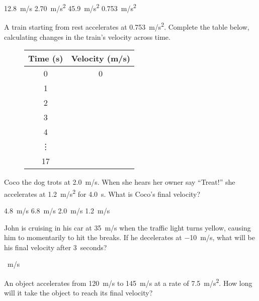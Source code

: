 \documentclass{exam}
\begin{document}
\begin{questions}
\begin{choices}
\choice \SI{12.8}{m/s}
\choice \SI{2.70}{m/s^2}
\choice \SI{45.9}{m/s^2}
\CorrectChoice \SI{0.753}{m/s^2} 
\end{choices}

\question 
A train starting from rest accelerates at \SI{0.753}{m/s^2}. Complete the table below, calculating changes in the train's velocity across time.

\begin{figure}[h!]
    \centering
    \begin{tabular}{c|c}
        \textbf{Time (s)} & \textbf{Velocity (m/s)} \\
        \hline
        0 & 0\\
        1 &  \\
        2 &  \\
        3 &  \\
        4 &  \\
        \vdots &  \\
        17 &  \\
    \end{tabular}
\end{figure}

\question
Coco the dog trots at \SI{2.0}{m/s}. When she hears her owner say ``Treat!'' she accelerates at \SI{1.2}{m/s^2} for \SI{4.0}{s}. What is Coco's final velocity?

\begin{choices}
    \choice \SI{4.8}{m/s}
    \correctchoice \SI{6.8}{m/s}
    \choice \SI{2.0}{m/s}
    \choice \SI{1.2}{m/s}
\end{choices}

John is cruising in his car at \SI{35}{m/s} when the traffic light turns yellow, causing him to momentarily to hit the breaks. If he decelerates at \SI{-10}{m/s}, what will be his final velocity after \SI{3}{seconds}?

\begin{choices}
    \correctchoice \SI{}{m/s}
\end{choices}

\question
An object accelerates from \SI{120}{m/s} to \SI{145}{m/s} at a rate of \SI{7.5}{m/s^2}. How long will it take the object to reach its final velocity?


\end{questions}
\end{document}

